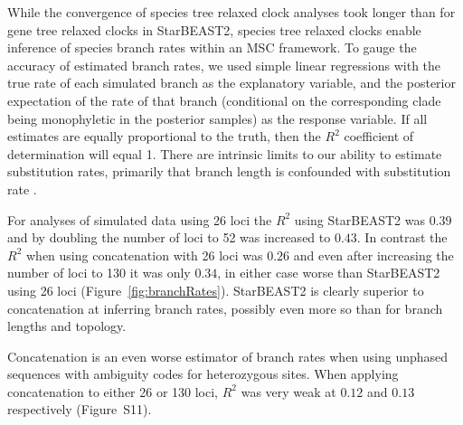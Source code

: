 \documentclass[nogrid]{MBE}%
\begin{document}
While the convergence of species tree relaxed clock analyses took longer than
for gene tree relaxed clocks in StarBEAST2, species tree relaxed clocks enable
inference of species branch rates within an MSC framework. To gauge the
accuracy of estimated branch rates, we used simple linear regressions with the
true rate of each simulated branch as the explanatory variable, and the
posterior expectation of the rate of that branch (conditional on the
corresponding clade being monophyletic in the posterior samples) as the
response variable. If all estimates are equally proportional to the truth,
then the $R^2$ coefficient of determination will equal 1. There are intrinsic
limits to our ability to estimate substitution rates, primarily that branch
length is confounded with substitution rate \citep{Thorne01092002}.

For analyses of simulated data using 26 loci the $R^2$ using StarBEAST2 was
$0.39$ and by doubling the number of loci to 52 was increased to $0.43$. In
contrast the $R^2$ when using concatenation with 26 loci was $0.26$ and even after
increasing the number of loci to 130 it was only $0.34$, in either case worse
than StarBEAST2 using 26 loci (Figure~\ref{fig:branchRates}). StarBEAST2 is
clearly superior to concatenation at inferring branch rates, possibly even
more so than for branch lengths and topology.

Concatenation is an even worse estimator of branch rates when using unphased
sequences with ambiguity codes for heterozygous sites. When applying
concatenation to either 26 or 130 loci, $R^2$ was very weak at $0.12$ and
$0.13$ respectively (Figure~S11).
\end{document}
